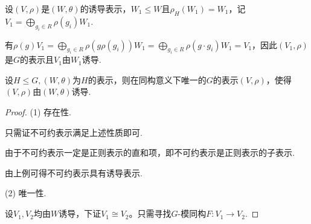 \begin{instance}
    设$(V, \rho)$是$(W, \theta)$的诱导表示，$W_1 \leqslant W$且$\rho_H(W_1) = W_1$，记$V_1 = \bigoplus_{g_i \in R} \rho(g_i) W_1$.\par
    有$\rho(g)V_1 = \bigoplus_{g_i \in R} \rho(g\rho(g_i)) W_1 = \bigoplus_{g_i \in R} \rho(g \cdot g_i) W_1 = V_1$，因此$(V_1, \rho)$是$G$的表示且$V_1$由$W_1$诱导.
\end{instance} 

\begin{theorem}[]
    设$H \leqslant G, (W, \theta)$为$H$的表示，则在同构意义下唯一的$G$的表示$(V, \rho)$，使得$(V, \rho)$由$(W, \theta)$诱导.
\end{theorem}

\begin{proof}
    (1) 存在性.\par
    只需证不可约表示满足上述性质即可.\par
    由于不可约表示一定是正则表示的直和项，即不可约表示是正则表示的子表示.\par
    由上例可得不可约表示具有诱导表示.\par
    (2) 唯一性.\par
    设$V_1, V_2$均由$W$诱导，下证$V_1 \cong V_2$。只需寻找$G$-模同构$F: V_1 \to V_2$.
\end{proof}
